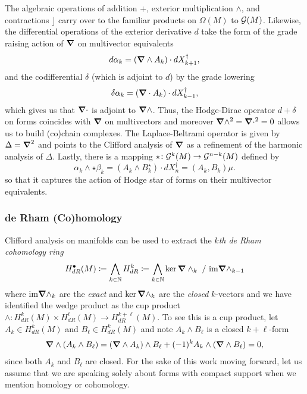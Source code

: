 \documentclass{article}
\begin{document}
The algebraic operations of addition $+$, exterior multiplication $\wedge$, and contractions $\rfloor$ carry over to the familiar products on $\Omega(M)$ to $\mathcal{G}(M)$. Likewise, the differential operations of the exterior derivative $d$ take the form of the grade raising action of $\boldsymbol{\nabla}$ on multivector equivalents
\begin{equation}
d \alpha_k = (\boldsymbol{\nabla} \wedge A_k) \cdot dX_{k+1}^\dagger,
\end{equation}
and the codifferential $\delta$ (which is adjoint to $d$) by the grade lowering
\begin{equation}
\delta \alpha_k = (\boldsymbol{\nabla} \cdot A_k)\cdot dX_{k-1}^\dagger,
\end{equation} 
which gives us that $\boldsymbol{\nabla} \cdot$ is adjoint to $\boldsymbol{\nabla} \wedge$. Thus, the Hodge-Dirac operator $d+\delta$ on forms coincides with $\boldsymbol{\nabla}$ on multivectors and moreover $\boldsymbol{\nabla} \wedge^2 = \boldsymbol{\nabla} \cdot^2=0$ allows us to build (co)chain complexes. The Laplace-Beltrami operator is given by $\Delta = \boldsymbol{\nabla}^2$ and points to the Clifford analysis of $\boldsymbol{\nabla}$ as a refinement of the harmonic analysis of $\Delta$. Lastly, there is a mapping $\star \colon \mathcal{G}^k(M)\to \mathcal{G}^{n-k}(M)$ defined by
\begin{equation}
\alpha_k \wedge \star \beta_k = (A_k \wedge B_k^{\star})\cdot dX_n^\dagger = (A_k,B_k) \mu.
\end{equation}
so that it captures the action of Hodge star of forms on their multivector equivalents. 

\subsubsection{de Rham (Co)homology}

\label{subsubsec:derham}

Clifford analysis on manifolds can be used to extract the \emph{$k$th de Rham cohomology ring}
\begin{equation}
H^\bullet_{dR}(M) \coloneqq \bigwedge_{k \in \mathbb{N}} H^k_{dR} \coloneqq \bigwedge_{k \in \mathbb{N}} \ker \boldsymbol{\nabla} \wedge_k ~/~ \mathrm{im} \boldsymbol{\nabla} \wedge_{k-1}
\end{equation}
where $\mathrm{im} \boldsymbol{\nabla} \wedge_k$ are the \emph{exact} and $\ker \boldsymbol{\nabla} \wedge_k$ are the \emph{closed} $k$-vectors and we have identified the wedge product as the cup product $\wedge \colon H^k_{dR}(M) \times H^\ell_{dR}(M) \to H^{k+\ell}_{dR}(M)$. To see this is a cup product, let $A_k \in H^k_{dR}(M)$ and $B_\ell \in H^k_{dR}(M)$ and note $A_k \wedge B_\ell$ is a closed $k+\ell$-form
\begin{align}
\boldsymbol{\nabla} \wedge (A_k \wedge B_\ell) = (\boldsymbol{\nabla} \wedge A_k) \wedge B_\ell + (-1)^k A_k \wedge (\boldsymbol{\nabla} \wedge B_\ell) = 0,
\end{align}
since both $A_k$ and $B_\ell$ are closed. For the sake of this work moving forward, let us assume that we are speaking solely about forms with compact support when we mention homology or cohomology.
\end{document}
